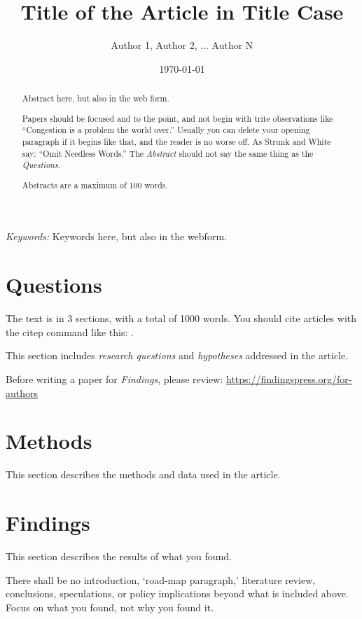 \documentclass{article}
\title{Title of the Article in Title Case}
\author{Author 1, Author 2, ... Author N}
\date{\today}
\begin{document}
\maketitle


\begin{abstract} 

Abstract here, but also in the web form.

Papers should be focused and to the point, and not begin with trite observations like “Congestion is a problem the world over.” Usually you can delete your opening paragraph if it begins like that, and the reader is no worse off. As Strunk and White say: ``Omit Needless Words.'' The \textit{Abstract} should not say the same thing as the \textit{Questions}.

Abstracts are a maximum of 100 words.
\end{abstract}

\textit{Keywords:} Keywords here, but also in the webform.


\section{Questions}
The text is in 3 sections, with a total of 1000 words. You should cite articles with the citep command like this: \citep{bell2008attacker}.

This section includes \textit{research questions} and \textit{hypotheses} addressed in the article.

Before writing a paper for \textit{Findings}, please review: \url{https://findingspress.org/for-authors}

\section{Methods}

This section describes the methods and data used in the article.


\section{Findings}

This section describes the results of what you found.

There shall be no introduction, `road-map paragraph,' literature review, conclusions, speculations, or policy implications beyond what is included above. Focus on what you found, not why you found it.
\end{document}
